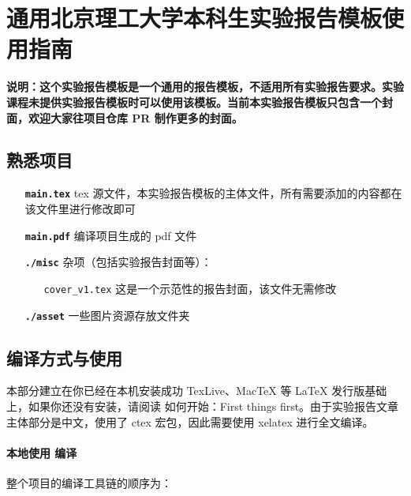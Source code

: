 \section{通用北京理工大学本科生实验报告模板使用指南}

\textbf{说明：这个实验报告模板是一个通用的报告模板，不适用所有实验报告要求。实验课程未提供实验报告模板时可以使用该模板。当前本实验报告模板只包含一个封面，欢迎大家往项目仓库 PR 制作更多的封面。}

\subsection{熟悉项目}

\begin{itemize}
  \item[\color{RubineRed}\textbf{\texttt{main.tex}}] tex 源文件，本实验报告模板的主体文件，所有需要添加的内容都在该文件里进行修改即可
  \item[\color{RubineRed}\textbf{\texttt{main.pdf}}] 编译项目生成的 pdf 文件
  \item[\color{RubineRed}\textbf{\texttt{./misc}}] 杂项（包括实验报告封面等）：
        \begin{itemize}
          \item[\color{RoyalBlue}\texttt{cover\_v1.tex}] 这是一个示范性的报告封面，该文件无需修改
        \end{itemize}
  \item[\color{RubineRed}\textbf{\texttt{./asset}}] 一些图片资源存放文件夹
\end{itemize}

\subsection{编译方式与使用}
本部分建立在你已经在本机安装成功 TexLive、MacTeX 等 LaTeX 发行版基础上，如果你还没有安装，请阅读 如何开始：First things first。由于实验报告文章主体部分是中文，使用了 ctex 宏包，因此需要使用 xelatex 进行全文编译。

\paragraph{本地使用 {} 编译}

整个项目的编译工具链的顺序为：
\begin{center}
\end{center}

